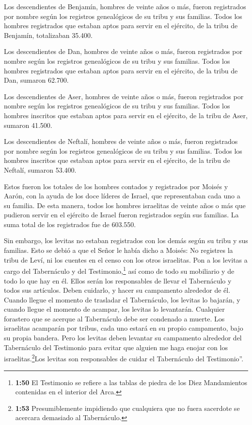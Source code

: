  Los descendientes de Benjamín, hombres de veinte años o
más, fueron registrados por nombre según los registros genealógicos de
su tribu y sus familias. Todos los hombres registrados que estaban aptos
para servir en el ejército,  de la tribu de Benjamín,
totalizaban 35.400.

 Los descendientes de Dan, hombres de veinte años o más,
fueron registrados por nombre según los registros genealógicos de su
tribu y sus familias. Todos los hombres registrados que estaban aptos
para servir en el ejército,  de la tribu de Dan, sumaron
62.700.

 Los descendientes de Aser, hombres de veinte años o más,
fueron registrados por nombre según los registros genealógicos de su
tribu y sus familias. Todos los hombres inscritos que estaban aptos para
servir en el ejército,  de la tribu de Aser, sumaron
41.500.

 Los descendientes de Neftalí, hombres de veinte años o
más, fueron registrados por nombre según los registros genealógicos de
su tribu y sus familias. Todos los hombres inscritos que estaban aptos
para servir en el ejército,  de la tribu de Neftalí,
sumaron 53.400.

 Estos fueron los totales de los hombres contados y
registrados por Moisés y Aarón, con la ayuda de los doce líderes de
Israel, que representaban cada uno a su familia.  De esta
manera, todos los hombres israelitas de veinte años o más que pudieron
servir en el ejército de Israel fueron registrados según sus familias.
 La suma total de los registrados fue de 603.550.

 Sin embargo, los levitas no estaban registrados con los
demás según su tribu y sus familias.  Esto se debió a que
el Señor le había dicho a Moisés:  No registres la tribu de
Leví, ni los cuentes en el censo con los otros israelitas. 
Pon a los levitas a cargo del Tabernáculo y del Testimonio,\footnote{\textbf{1:50}
  El Testimonio se refiere a las tablas de piedra de los Diez
  Mandamientos contenidas en el interior del Arca.} así como de todo su
mobiliario y de todo lo que hay en él. Ellos serán los responsables de
llevar el Tabernáculo y todos sus artículos. Deben cuidarlo, y hacer su
campamento alrededor de él.  Cuando llegue el momento de
trasladar el Tabernáculo, los levitas lo bajarán, y cuando llegue el
momento de acampar, los levitas lo levantarán. Cualquier forastero que
se acerque al Tabernáculo debe ser condenado a muerte.  Los
israelitas acamparán por tribus, cada uno estará en su propio
campamento, bajo su propia bandera.  Pero los levitas deben
levantar su campamento alrededor del Tabernáculo del Testimonio para
evitar que alguien me haga enojar con los israelitas.\footnote{\textbf{1:53}
  Presumiblemente impidiendo que cualquiera que no fuera sacerdote se
  acercara demasiado al Tabernáculo.}Los levitas son responsables de
cuidar el Tabernáculo del Testimonio''.

